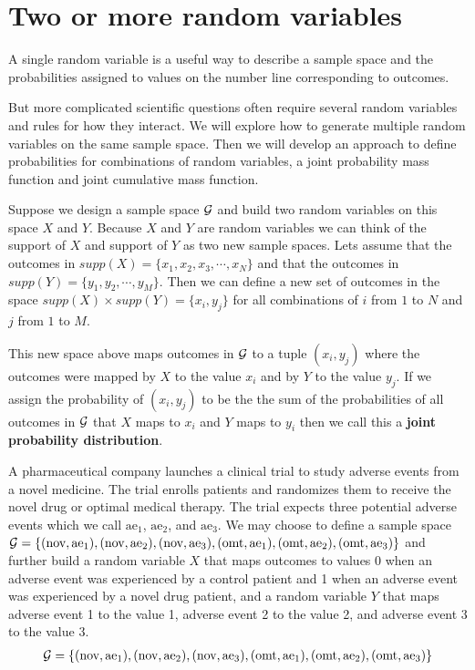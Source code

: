 \section{Two or more random variables}

A single random variable is a useful way to describe a sample space and the probabilities assigned to values on the number line corresponding to outcomes.

But more complicated scientific questions often require several random variables and rules for how they interact.
We will explore how to generate multiple random variables  on the same sample space. 
Then we will develop an approach to define probabilities for combinations of random variables, a joint probability mass function and joint cumulative mass function.

Suppose we design a sample space $\mathcal{G}$ and build two random variables on this space $X$ and $Y$.
Because $X$ and $Y$ are random variables we can think of the support of $X$ and support of $Y$ as two new sample spaces. Lets assume that the outcomes in $supp(X) = \{x_{1},x_{2},x_{3},\cdots,x_{N}\}$ and that the outcomes in $supp(Y) = \{y_{1},y_{2},\cdots,y_{M}\}$. 
Then we can define a new set of outcomes in the space $supp(X) \times supp(Y) = \{x_{i}, y_{j}\}$ for all combinations of $i$ from $1$ to $N$ and $j$ from $1$ to $M$.

This new space above maps outcomes in $\mathcal{G}$ to a tuple $(x_{i},y_{j})$  where the outcomes were mapped by $X$ to the value $x_{i}$ and by $Y$ to the value $y_{j}$. 
If we assign the probability of $(x_{i},y_{j})$ to be the the sum of the probabilities of all outcomes in $\mathcal{G}$ that $X$ maps to $x_{i}$ and $Y$ maps to $y_{i}$ then we call this a \textbf{joint probability distribution}. 

\ex A pharmaceutical company launches a clinical trial to study adverse events from a novel medicine. The trial enrolls patients and randomizes them to receive the novel drug or optimal medical therapy. The trial expects three potential adverse events which we call $\text{ae}_{1}$, $\text{ae}_{2}$, and $\text{ae}_{3}$.
We may choose to define a sample space $\mathcal{G} = \{(\text{nov},\text{ae}_{1}),(\text{nov},\text{ae}_{2}),(\text{nov},\text{ae}_{3}),(\text{omt},\text{ae}_{1}),(\text{omt},\text{ae}_{2}),(\text{omt},\text{ae}_{3})\}$ and further build a random variable $X$ that maps outcomes to values 0 when an adverse event was experienced by a control patient and 1 when an adverse event was experienced by a novel drug patient, and a random variable $Y$ that maps adverse event 1 to the value 1, adverse event 2 to the value 2, and adverse event 3 to the value 3.
\begin{align*}
    \mathcal{G} = \{(\text{nov},\text{ae}_{1}),(\text{nov},\text{ae}_{2}),(\text{nov},\text{ae}_{3}),(\text{omt},\text{ae}_{1}),(\text{omt},\text{ae}_{2}),(\text{omt},\text{ae}_{3})\}
\end{align*}

